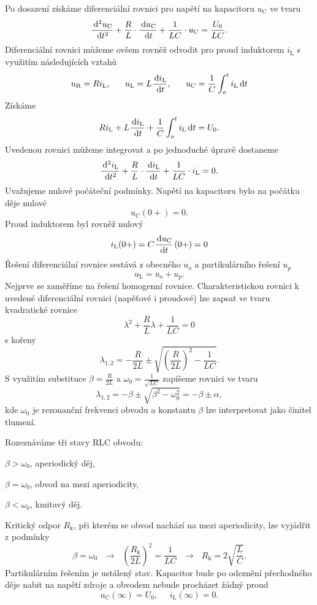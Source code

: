 Po dosazení získáme diferenciální rovnici pro napětí na kapacitoru $u_\mathrm{C}$ ve tvaru
$$
\frac{\,\mathrm{d}^2 u_\mathrm{C}}{\,\mathrm{d} t^2} + \frac{R}{L} \cdot \frac{\,\mathrm{d} u_\mathrm{C}}{\,\mathrm{d} t} + \frac{1}{LC} \cdot u_\mathrm{C} = \frac{U_0}{LC}.
$$
Diferenciální rovnici můžeme ovšem rovněž odvodit pro proud induktorem $i_\mathrm{L}$ s využitím následujících vztahů
$$
u_\mathrm{R} = Ri_\mathrm{L},~~~~~
u_\mathrm{L} = L \frac{\,\mathrm{d} i_\mathrm{L}}{\,\mathrm{d} t} ,~~~~~u_\mathrm{C} = \frac{1}{C} \int_o^t i_\mathrm{L} \,\mathrm{d} t
$$
Získáme
$$
Ri_\mathrm{L} + L \frac{\,\mathrm{d} i_\mathrm{L}}{\,\mathrm{d} t} + \frac{1}{C} \int_o^t i_\mathrm{L} \,\mathrm{d} t = U_0.
$$
Uvedenou rovnici můžeme integrovat a po jednoduché úpravě dostaneme
$$
\frac{\,\mathrm{d}^2 i_\mathrm{L}}{\,\mathrm{d} t^2} + \frac{R}{L} \cdot \frac{\,\mathrm{d} i_\mathrm{L}}{\,\mathrm{d} t} + \frac{1}{LC} \cdot i_\mathrm{L} = 0.
$$
Uvažujeme nulové počáteční podmínky. Napětí na kapacitoru bylo na počátku děje nulové
$$
u_\mathrm{C}(0+) = 0.
$$
Proud induktorem byl rovněž nulový
$$
i_\mathrm{L}(0+) = C \frac{\,\mathrm{d} u_\mathrm{C}}{\,\mathrm{d} t} \left( 0+ \right) = 0
$$
Řešení diferenciální rovnice sestává z obecného $u_o$ a partikulárního řešení $u_p$
$$
u_\mathrm{L} = u_o + u_p.
$$
Nejprve se zaměříme na řešení homogenní rovnice. Charakteristickou rovnici k uvedené diferenciální rovnici (napěťové i proudové) lze zapsat ve tvaru kvadratické rovnice
$$
\lambda^2 + \frac{R}{L} \lambda + \frac{1}{LC} = 0
$$
s kořeny
$$
\lambda_{1,2} = -\frac{R}{2L} \pm \sqrt{\left( \frac{R}{2L} \right)^2 - \frac{1}{LC}}.
$$
S využitím substituce $\beta = \frac{R}{2L}$ a $\omega_0 = \frac{1}{\sqrt{LC}}$ zapíšeme rovnici ve tvaru
$$
\lambda_{1,2} = -\beta \pm \sqrt{\beta^2 - \omega_0^2} = -\beta \pm \alpha,
$$
kde $\omega_0$ je rezonanční frekvenci obvodu a konstantu $\beta$ lze interpretovat jako činitel tlumení. 

Rozeznáváme tři stavy RLC obvodu:
\begin{enumerate*}
\item $\beta > \omega_0$, aperiodický děj,
\item $\beta = \omega_0$, obvod na mezi aperiodicity,
\item $\beta < \omega_0$, kmitavý děj.
\end{enumerate*}
Kritický odpor $R_\mathrm{k}$, při kterém se obvod nachází na mezi aperiodicity, lze vyjádřit z podmínky
$$
\beta = \omega_0~~~ \rightarrow ~~~\left( \frac{R_\mathrm{k}}{2L} \right)^2 = \frac{1}{LC}~~~ \rightarrow ~~~R_\mathrm{k} = 2 \sqrt{\frac{L}{C}}.
$$
Partikulárním řešením je ustálený stav. Kapacitor bude po odeznění přechodného děje nabit na napětí zdroje a obvodem nebude procházet žádný proud 
$$
u_\mathrm{C}(\infty) = U_0,~~~~~~
i_\mathrm{L}(\infty) = 0.
$$

